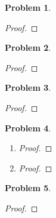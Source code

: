\documentclass[11pt]{article}
\newtheorem{problem}{Problem}
\begin{document}
\begin{problem}

\end{problem}
\begin{proof}

\end{proof}



\begin{problem}

\end{problem}

\begin{proof}

\end{proof}

\begin{problem}

\end{problem}
\begin{proof}

\end{proof}



\begin{problem}

\end{problem}
\begin{enumerate}
\item 
\begin{proof}

\end{proof}
\item
\begin{proof}

\end{proof}
\end{enumerate}



\begin{problem}

\end{problem}
\begin{proof}

\end{proof}
\end{document}
